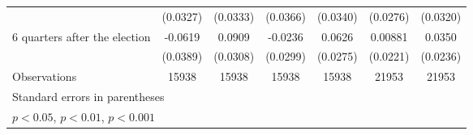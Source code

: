 \begin{table}[htbp]
\begin{tabular}{l*{6}{c}}
                    &    (0.0327)         &    (0.0333)         &    (0.0366)         &    (0.0340)         &    (0.0276)         &    (0.0320)         \\
[1em]
 6 quarters after the election&     -0.0619         &      0.0909\sym{**} &     -0.0236         &      0.0626\sym{*}  &     0.00881         &      0.0350         \\
                    &    (0.0389)         &    (0.0308)         &    (0.0299)         &    (0.0275)         &    (0.0221)         &    (0.0236)         \\
\hline
Observations        &       15938         &       15938         &       15938         &       15938         &       21953         &       21953         \\
\hline\hline
\multicolumn{7}{l}{\footnotesize Standard errors in parentheses}\\
\multicolumn{7}{l}{\footnotesize \sym{*} \(p<0.05\), \sym{**} \(p<0.01\), \sym{***} \(p<0.001\)}\\
\end{tabular}
\end{table}
